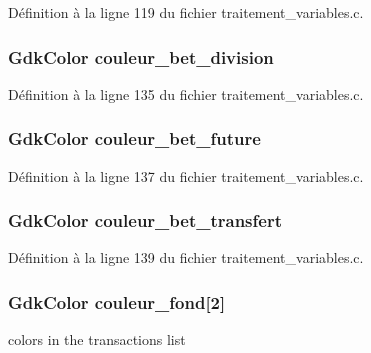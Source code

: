 Définition à la ligne 119 du fichier traitement\_\-variables.c.

\subsubsection[{couleur\_\-bet\_\-division}]{\setlength{\rightskip}{0pt plus 5cm}GdkColor {\bf couleur\_\-bet\_\-division}}\label{gsb__file__save_8c_a9c6b0a0f3037804c43aa435dbb98f7ec}


Définition à la ligne 135 du fichier traitement\_\-variables.c.

\subsubsection[{couleur\_\-bet\_\-future}]{\setlength{\rightskip}{0pt plus 5cm}GdkColor {\bf couleur\_\-bet\_\-future}}\label{gsb__file__save_8c_af7f95b1eb6717e97b624b506258fd893}


Définition à la ligne 137 du fichier traitement\_\-variables.c.

\subsubsection[{couleur\_\-bet\_\-transfert}]{\setlength{\rightskip}{0pt plus 5cm}GdkColor {\bf couleur\_\-bet\_\-transfert}}\label{gsb__file__save_8c_abf473d007a5860d19e62be3c33654a48}


Définition à la ligne 139 du fichier traitement\_\-variables.c.

\subsubsection[{couleur\_\-fond}]{\setlength{\rightskip}{0pt plus 5cm}GdkColor {\bf couleur\_\-fond}[2]}\label{gsb__file__save_8c_a58089bf9225ae2e274165369f8bc7a00}
colors in the transactions list 

